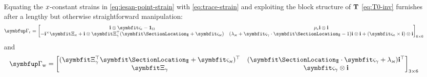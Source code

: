 Equating the \(x\)-constant strains in \eqref{eq:iesan-point-strain} with \eqref{eq:trace-strain} and exploiting the block structure of \(\mathbf{T}\) \eqref{eq:T0-inv} furnishes after a lengthy but otherwise straightforward manipulation:
\begin{equation}
\RigidShift = \begin{bmatrix}
\FrameBasis\otimes\ShiftN - \oneS & \ShiftScaleN\FrameBasis\otimes\FrameBasis %
\\
-\FrameBasis^{\times}\ShiftA + %
\FrameBasis\otimes\ShiftB^{\top}(\CenterShearLocation +\ShiftT)
& (\ShiftScaleT + \ShiftK\cdot\CenterShearLocation - 1)\FrameBasis\otimes\FrameBasis + (\ShiftF\times\FrameBasis)\otimes\FrameBasis
\end{bmatrix}_{6\times6}
\label{eq:class-ii-Le}
\end{equation}
and
\begin{equation}
\ShapeShift = 
\begin{bmatrix}
(\ShiftB^{\top}\CenterShearLocation + \ShiftT)^{\top} & (\CenterShearLocation\cdot\ShiftK + \ShiftScaleT)\FrameBasis^{\top} \\
\ShiftB & \ShiftK\otimes\FrameBasis
\end{bmatrix}_{3\times6}
\label{eq:class-i-La}
\end{equation}





